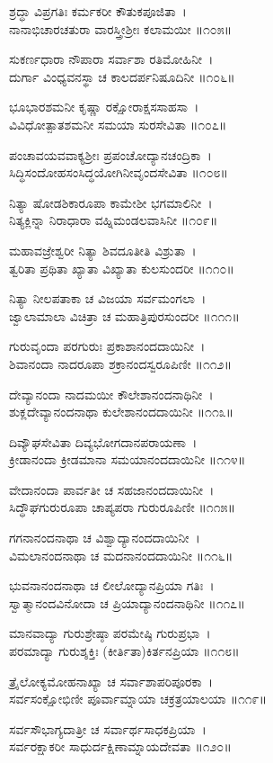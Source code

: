 ಶ್ರದ್ಧಾ ವಿಪ್ರಗತಿಃ ಕರ್ಮಕರೀ ಕೌತುಕಪೂಜಿತಾ~।\\
ನಾನಾಭಿಚಾರಚತುರಾ ವಾರಸ್ತ್ರೀಶ್ರೀಃ ಕಲಾಮಯೀ ॥೧೦೫॥

	ಸುಕರ್ಣಧಾರಾ ನೌಪಾರಾ ಸರ್ವಾಶಾ ರತಿಮೋಹಿನೀ~।\\
	ದುರ್ಗಾ ವಿಂಧ್ಯವನಸ್ಥಾ ಚ ಕಾಲದರ್ಪನಿಷೂದಿನೀ ॥೧೦೬॥

ಭೂಭಾರಶಮನೀ ಕೃಷ್ಣಾ ರಕ್ಷೋರಾಕ್ಷಸಸಾಹಸಾ~।\\
ವಿವಿಧೋತ್ಪಾತಶಮನೀ ಸಮಯಾ ಸುರಸೇವಿತಾ ॥೧೦೭॥

	ಪಂಚಾವಯವವಾಕ್ಯಶ್ರೀಃ ಪ್ರಪಂಚೋದ್ಯಾನಚಂದ್ರಿಕಾ~।\\
	ಸಿದ್ಧಿಸಂದೋಹಸಂಸಿದ್ಧಯೋಗಿನೀವೃಂದಸೇವಿತಾ ॥೧೦೮॥

ನಿತ್ಯಾ ಷೋಡಶಿಕಾರೂಪಾ ಕಾಮೇಶೀ ಭಗಮಾಲಿನೀ~।\\
ನಿತ್ಯಕ್ಲಿನ್ನಾ ನಿರಾಧಾರಾ ವಹ್ನಿಮಂಡಲವಾಸಿನೀ ॥೧೦೯॥

	ಮಹಾವಜ್ರೇಶ್ವರೀ ನಿತ್ಯಾ ಶಿವದೂತೀತಿ ವಿಶ್ರುತಾ~।\\
	ತ್ವರಿತಾ ಪ್ರಥಿತಾ ಖ್ಯಾತಾ ವಿಖ್ಯಾತಾ ಕುಲಸುಂದರೀ ॥೧೧೦॥

ನಿತ್ಯಾ ನೀಲಪತಾಕಾ ಚ ವಿಜಯಾ ಸರ್ವಮಂಗಲಾ~।\\
ಜ್ವಾಲಾಮಾಲಾ ವಿಚಿತ್ರಾ ಚ ಮಹಾತ್ರಿಪುರಸುಂದರೀ ॥೧೧೧॥

	ಗುರುವೃಂದಾ ಪರಗುರುಃ ಪ್ರಕಾಶಾನಂದದಾಯಿನೀ~।\\
	ಶಿವಾನಂದಾ ನಾದರೂಪಾ ಶಕ್ರಾನಂದಸ್ವರೂಪಿಣೀ ॥೧೧೨॥

ದೇವ್ಯಾನಂದಾ ನಾದಮಯೀ ಕೌಲೇಶಾನಂದನಾಥಿನೀ~।\\
ಶುಕ್ಲದೇವ್ಯಾನಂದನಾಥಾ ಕುಲೇಶಾನಂದದಾಯಿನೀ ॥೧೧೩॥

	ದಿವ್ಯೌಘಸೇವಿತಾ ದಿವ್ಯಭೋಗದಾನಪರಾಯಣಾ~।\\
	ಕ್ರೀಡಾನಂದಾ ಕ್ರೀಡಮಾನಾ ಸಮಯಾನಂದದಾಯಿನೀ ॥೧೧೪॥

ವೇದಾನಂದಾ ಪಾರ್ವತೀ ಚ ಸಹಜಾನಂದದಾಯಿನೀ~।\\
ಸಿದ್ಧೌಘಗುರುರೂಪಾ ಚಾಪ್ಯಪರಾ ಗುರುರೂಪಿಣೀ ॥೧೧೫॥

	ಗಗನಾನಂದನಾಥಾ ಚ ವಿಶ್ವಾದ್ಯಾನಂದದಾಯಿನೀ~।\\
	ವಿಮಲಾನಂದನಾಥಾ ಚ ಮದನಾನಂದದಾಯಿನೀ ॥೧೧೬॥

ಭುವನಾನಂದನಾಥಾ ಚ ಲೀಲೋದ್ಯಾನಪ್ರಿಯಾ ಗತಿಃ~।\\
ಸ್ವಾತ್ಮಾನಂದವಿನೋದಾ ಚ ಪ್ರಿಯಾದ್ಯಾನಂದನಾಥಿನೀ ॥೧೧೭॥

	ಮಾನವಾದ್ಯಾ ಗುರುಶ್ರೇಷ್ಠಾ ಪರಮೇಷ್ಠಿ ಗುರುಪ್ರಭಾ~।\\
	ಪರಮಾದ್ಯಾ ಗುರುಶ್ಶಕ್ತಿಃ (ಕೀರ್ತಿತಾ)ಕಿರ್ತನಪ್ರಿಯಾ ॥೧೧೮॥

ತ್ರೈಲೋಕ್ಯಮೋಹನಾಖ್ಯಾ ಚ ಸರ್ವಾಶಾಪರಿಪೂರಕಾ~।\\
ಸರ್ವಸಂಕ್ಷೋಭಿಣೀ ಪೂರ್ವಾಮ್ನಾಯಾ ಚಕ್ರತ್ರಯಾಲಯಾ ॥೧೧೯॥

	ಸರ್ವಸೌಭಾಗ್ಯದಾತ್ರೀ ಚ ಸರ್ವಾರ್ಥಸಾಧಕಪ್ರಿಯಾ~।\\
	ಸರ್ವರಕ್ಷಾಕರೀ ಸಾಧುರ್ದಕ್ಷಿಣಾಮ್ನಾಯದೇವತಾ ॥೧೨೦॥

